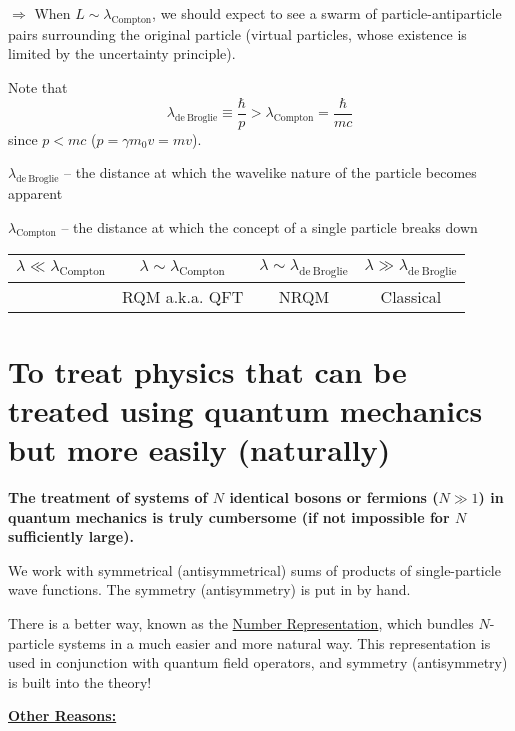 \documentclass{article}
\begin{document}
\noindent $\Rightarrow$ When $ L \sim \lambda_\mathrm{Compton} $, we should expect to see a swarm of particle-antiparticle pairs surrounding the original particle (virtual particles, whose existence is limited by the uncertainty principle).

\noindent Note that
\begin{equation*}
\lambda_\mathrm{de~Broglie} \equiv \dfrac{\hbar}{p} > \lambda_\mathrm{Compton} = \dfrac{\hbar}{mc}
\end{equation*}
since $ p < m c $ ($ p = \gamma m_0 v = m v $).

\noindent $\lambda_\mathrm{de~Broglie}$ -- the distance at which the wavelike nature of the particle becomes apparent


\noindent $\lambda_\mathrm{Compton}$ -- the distance at which the concept of a single particle breaks down

\begin{center}
\begin{tabular}{|c|c|c|c|}
\hline 
$\lambda \ll \lambda_\mathrm{Compton}$ & $\lambda \sim \lambda_\mathrm{Compton}$ & $\lambda \sim \lambda_\mathrm{de~Broglie}$ & $\lambda \gg \lambda_\mathrm{de~Broglie}$ \\ 
\hline
& RQM a.k.a. QFT & NRQM & Classical \\
\hline
\end{tabular} 
\end{center}

\section{To treat physics that can be treated using quantum mechanics but more easily (naturally)}

\noindent \textbf{The treatment of systems of $N$ identical bosons or fermions ($ N \gg 1 $) in quantum mechanics is truly cumbersome (if not impossible for $N$ sufficiently large).}

\noindent We work with symmetrical (antisymmetrical) sums of products of single-particle wave functions. The symmetry (antisymmetry) is put in by hand.

\noindent There is a better way, known as the \underline{Number Representation}, which bundles $N$-particle systems in a much easier and more natural way. This representation is used in conjunction with quantum field operators, and symmetry (antisymmetry) is built into the theory!

\vspace{12pt}
\noindent \underline{\textbf{Other Reasons:}}
\end{document}
